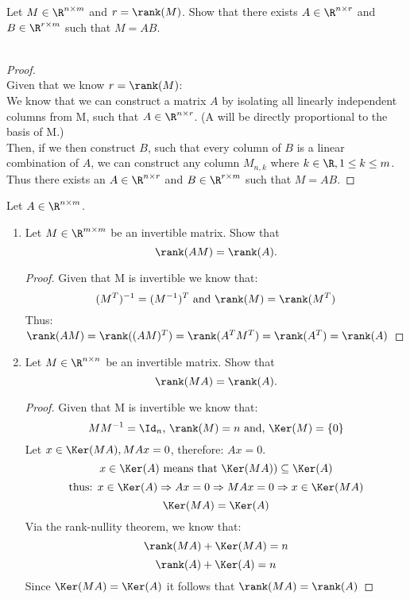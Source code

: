 \documentclass[11pt,nocut]{article}
\begin{document}
\begin{problem}[2 points]
	Let $M \in \R^{n \times m}$ and $r = \rank(M)$. Show that there exists $A \in \R^{n \times r}$ and $B \in \R^{r \times m}$ such that $M = AB$. \\ \\
	\vspace{1mm}
	\begin{proof} \\
	Given that we know $r = \rank(M)$:\\ 
	We know that we can construct a matrix $A$ by isolating all linearly independent columns from M, such that $A \in \R^{n \times r}$. (A will be directly proportional to the basis of M.)\\
	Then, if we then construct $B$, such that every column of $B$ is a linear combination of $A$, we can construct any column $M_{n,k}$ where $k \in \R, 1 \leq k \leq m$. Thus there exists an $A \in \R^{n \times r}$ and $B \in \R^{r \times m}$ such that $M = AB$.
	\end{proof}
\end{problem}

\vspace{1mm}

\begin{problem}[3 points]
Let $A \in \R^{n \times m}$. 
	\begin{enumerate}[label=\normalfont(\textbf{\alph*})]
		\item Let $M \in \R^{m \times m}$ be an invertible matrix.
			Show that
			$$
			\rank(AM) = \rank(A).
			$$
		\begin{proof}
		Given that M is invertible we know that:
		$$
		(M^T)^{-1} = (M^{-1})^T \mbox{ and }\rank(M) = \rank(M^T)
		$$
		Thus: $\rank(AM) = \rank((AM)^T) = \rank(A^TM^T) = \rank(A^T) = \rank(A)$
		\end{proof}
		\item Let $M \in \R^{n \times n}$ be an invertible matrix.
			Show that
			$$
			\rank(MA) = \rank(A).
			$$
		\begin{proof}
		Given that M is invertible we know that:
		$$
		M M^{-1} = \Id_n \mbox{, } \rank(M) = n \mbox{ and, } \Ker(M) = \{0\}
		$$
		Let $x \in \Ker(MA), M A x = 0$, therefore: $A x = 0$.
		$$
		x \in \Ker(A) \mbox{ means that } \Ker(MA)) \subseteq \Ker(A)
		$$
		$$
		\mbox{thus: } x \in \Ker(A) \Rightarrow Ax = 0 \Rightarrow M Ax = 0 \Rightarrow x \in \Ker(MA)
		$$
		$$
		\Ker(MA) = \Ker(A)
		$$
		Via the rank-nullity theorem, we know that: 
		$$
		\rank(MA)+ \Ker(MA) = n
		$$
		$$
		\rank(A) + \Ker(A) = n
		$$
		Since $\Ker(MA) = \Ker(A)$ it follows that $\rank(MA) = \rank(A)$
		\end{proof}
\end{enumerate}
\end{problem}
\end{document}
